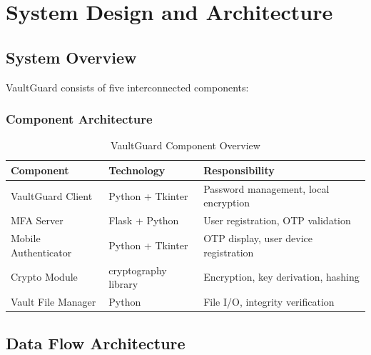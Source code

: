 \documentclass[12pt,a4paper]{report}
\begin{document}
\chapter{System Design and Architecture}

\section{System Overview}

VaultGuard consists of five interconnected components:

\subsection{Component Architecture}

\begin{table}[H]
\centering
\begin{tabular}{|p{3cm}|p{4cm}|p{5cm}|}
\hline
\textbf{Component} & \textbf{Technology} & \textbf{Responsibility} \\
\hline
VaultGuard Client & Python + Tkinter & Password management, local encryption \\
MFA Server & Flask + Python & User registration, OTP validation \\
Mobile Authenticator & Python + Tkinter & OTP display, user device registration \\
Crypto Module & cryptography library & Encryption, key derivation, hashing \\
Vault File Manager & Python & File I/O, integrity verification \\
\hline
\end{tabular}
\caption{VaultGuard Component Overview}
\end{table}

\section{Data Flow Architecture}
\end{document}
